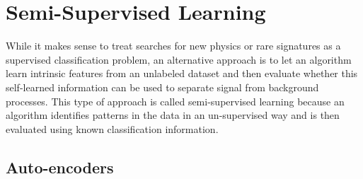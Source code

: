 \section{Semi-Supervised Learning}
\label{sec:semisupervised}
While it makes sense to treat searches for new physics or rare signatures as a supervised classification problem, an alternative approach is to let an algorithm learn intrinsic features from an unlabeled dataset and then evaluate whether this self-learned information can be used to separate signal from background processes. This type of approach is called semi-supervised learning because an algorithm identifies patterns in the data in an un-supervised way and is then evaluated using known classification information.

\subsection{Auto-encoders}

